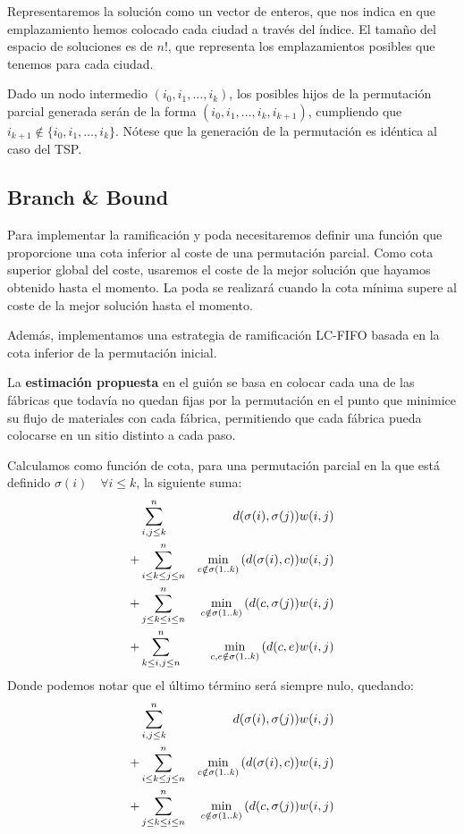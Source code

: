 \documentclass[a4paper, 11pt]{article} %
\begin{document}
      Representaremos la solución como un vector de enteros, que nos indica en que emplazamiento hemos colocado cada ciudad a 
      través del índice. El tamaño del espacio de soluciones es de $n!$, que representa los emplazamientos posibles que tenemos 
      para cada ciudad.
      
      Dado un nodo intermedio $(i_0,i_1,\dots,i_k)$, los posibles hijos de la permutación parcial generada serán
      de la forma $(i_0,i_1,\dots,i_k, i_{k+1})$, cumpliendo que $i_{k+1} \notin \{i_0,i_1,\dots,i_k\}$. Nótese
      que la generación de la permutación es idéntica al caso del TSP.
    
    \subsection{Branch \& Bound}
      Para implementar la ramificación y poda necesitaremos definir una función que proporcione una
      cota inferior al coste de una permutación parcial. Como cota superior global del coste, usaremos el
      coste de la mejor solución que hayamos obtenido hasta el momento. La poda se realizará cuando la cota
      mínima supere al coste de la mejor solución hasta el momento.
      
      Además, implementamos una estrategia de ramificación LC-FIFO basada en la cota inferior de la permutación
      inicial.
      
      La \textbf{estimación propuesta} en el guión se basa en colocar cada una de las fábricas que todavía no
      quedan fijas por la permutación en el punto que minimice su flujo de materiales con cada fábrica,
      permitiendo que cada fábrica pueda colocarse en un sitio distinto a cada paso.
      
      Calculamos como función de cota, para una permutación parcial en la que está definido $\sigma(i) \quad \forall i \leq k$,
      la siguiente suma:
      \begin{eqnarray*}
      \displaystyle
	  & \sum_{i,j \leq k}^n & d(\sigma(i),\sigma(j)) w(i,j) \\
	+ & \sum_{i \leq k \leq j \leq n}^n & \min_{c \notin \sigma(1..k)}{(d(\sigma(i),c))} w(i,j) \\
	+ & \sum_{j \leq k \leq i \leq n}^n & \min_{c \notin \sigma(1..k)}{(d(c,\sigma(j))} w(i,j) \\
	+ & \sum_{k \leq i,j \leq n}^n& \min_{c,e \notin \sigma(1..k)}{(d(c,e)} w(i,j) \\
      \end{eqnarray*}
      Donde podemos notar que el último término será siempre nulo, quedando:
      \begin{eqnarray*}
      \displaystyle
	  & \sum_{i,j \leq k}^n & d(\sigma(i),\sigma(j)) w(i,j) \\
	+ & \sum_{i \leq k \leq j \leq n}^n & \min_{c \notin \sigma(1..k)}{(d(\sigma(i),c))} w(i,j) \\
	+ & \sum_{j \leq k \leq i \leq n}^n & \min_{c \notin \sigma(1..k)}{(d(c,\sigma(j))} w(i,j) \\
      \end{eqnarray*}
      \medskip
      
\end{document}
